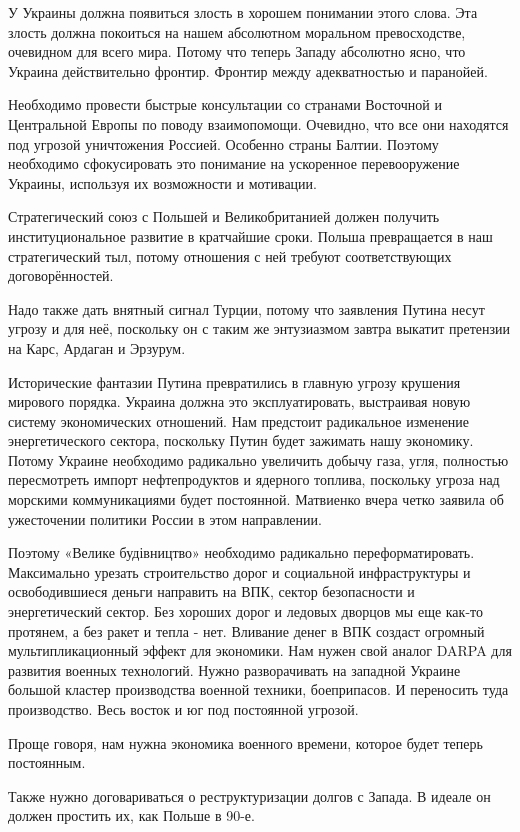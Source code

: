 У Украины должна появиться злость в хорошем понимании этого слова. Эта злость
должна покоиться на нашем абсолютном моральном превосходстве, очевидном для
всего мира. Потому что теперь Западу абсолютно ясно, что Украина действительно
фронтир. Фронтир между адекватностью и паранойей.

Необходимо провести быстрые консультации со странами Восточной и Центральной
Европы по поводу взаимопомощи. Очевидно, что все они находятся под угрозой
уничтожения Россией. Особенно страны Балтии. Поэтому необходимо сфокусировать
это понимание на ускоренное перевооружение Украины, используя их возможности и
мотивации.

Стратегический союз с Польшей и Великобританией должен получить
институциональное развитие в кратчайшие сроки. Польша превращается в наш
стратегический тыл, потому отношения с ней требуют соответствующих
договорённостей.

Надо также дать внятный сигнал Турции, потому что заявления Путина несут угрозу
и для неё, поскольку он с таким же энтузиазмом завтра выкатит претензии на
Карс, Ардаган и Эрзурум.

Исторические фантазии Путина превратились в главную угрозу крушения мирового
порядка. Украина должна это эксплуатировать, выстраивая новую систему
экономических отношений. Нам предстоит радикальное изменение энергетического
сектора, поскольку Путин будет зажимать нашу экономику. Потому Украине
необходимо радикально увеличить добычу газа, угля, полностью пересмотреть
импорт нефтепродуктов и ядерного топлива, поскольку угроза над морскими
коммуникациями будет постоянной. Матвиенко вчера четко заявила об ужесточении
политики России в этом направлении.

Поэтому «Велике будівництво» необходимо радикально переформатировать.
Максимально урезать строительство дорог и социальной инфраструктуры и
освободившиеся деньги направить на ВПК, сектор безопасности и энергетический
сектор. Без хороших дорог и ледовых дворцов мы еще как-то протянем, а без ракет
и тепла - нет. Вливание денег в ВПК создаст огромный мультипликационный эффект
для экономики. Нам нужен свой аналог DARPA для развития военных технологий.
Нужно разворачивать на западной Украине большой кластер производства военной
техники, боеприпасов. И переносить туда производство. Весь восток и юг под
постоянной угрозой.

Проще говоря, нам нужна экономика военного времени, которое будет теперь
постоянным.

Также нужно договариваться о реструктуризации долгов с Запада. В идеале он
должен простить их, как Польше в 90-е.

